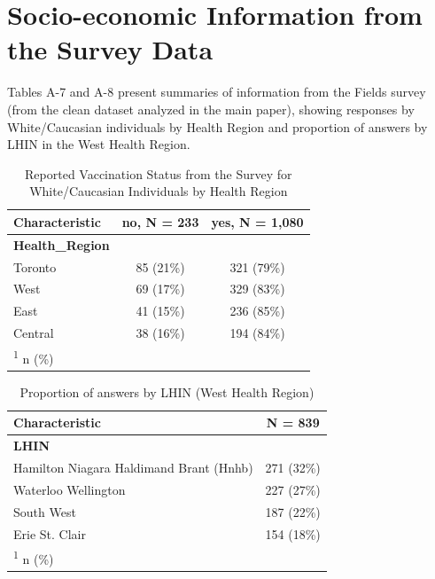 \documentclass[
  letterpaper,
  DIV=11,
  numbers=noendperiod]{scrartcl}
\begin{document}
\hypertarget{socio-economic-information-from-the-survey-data}{%
\section{Socio-economic Information from the Survey
Data}\label{socio-economic-information-from-the-survey-data}}

Tables A-7 and A-8 present summaries of information from the Fields
survey (from the clean dataset analyzed in the main paper), showing
responses by White/Caucasian individuals by Health Region and proportion
of answers by LHIN in the West Health Region.

\hypertarget{tbl-hr-percentages}{}
\begin{table}
\caption{\label{tbl-hr-percentages}Reported Vaccination Status from the Survey for White/Caucasian
Individuals by Health Region }\tabularnewline

\centering
\begin{tabular}{lcc}
\toprule
\textbf{Characteristic} & \textbf{no}, N = 233 & \textbf{yes}, N = 1,080\\
\midrule
\textbf{Health\_Region} &  & \\
\hspace{1em}Toronto & 85 (21\%) & 321 (79\%)\\
\hspace{1em}West & 69 (17\%) & 329 (83\%)\\
\hspace{1em}East & 41 (15\%) & 236 (85\%)\\
\hspace{1em}Central & 38 (16\%) & 194 (84\%)\\
\bottomrule
\multicolumn{3}{l}{\rule{0pt}{1em}\textsuperscript{1} n (\%)}\\
\end{tabular}
\end{table}

\hypertarget{tbl-west-hr-lhin}{}
\begin{table}
\caption{\label{tbl-west-hr-lhin}Proportion of answers by LHIN (West Health Region) }\tabularnewline

\centering
\begin{tabular}{lc}
\toprule
\textbf{Characteristic} & \textbf{N = 839}\\
\midrule
\textbf{LHIN} & \\
\hspace{1em}Hamilton Niagara Haldimand Brant (Hnhb) & 271 (32\%)\\
\hspace{1em}Waterloo Wellington & 227 (27\%)\\
\hspace{1em}South West & 187 (22\%)\\
\hspace{1em}Erie St. Clair & 154 (18\%)\\
\bottomrule
\multicolumn{2}{l}{\rule{0pt}{1em}\textsuperscript{1} n (\%)}\\
\end{tabular}
\end{table}
\end{document}
